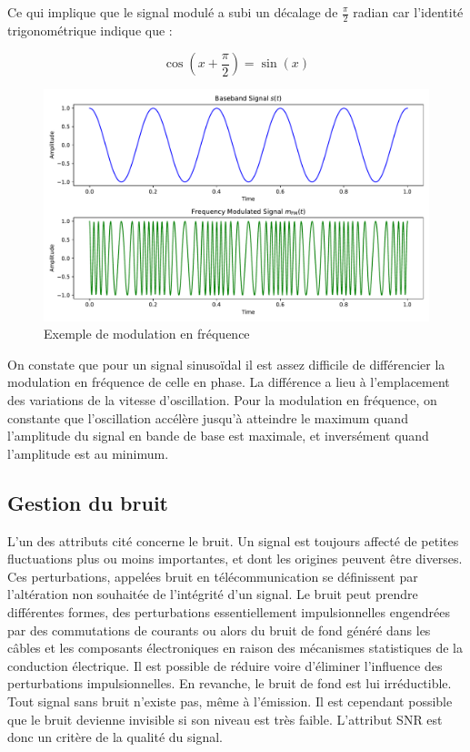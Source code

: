 Ce qui implique que le signal modulé a subi un décalage de $\frac{\pi}{2}$ radian car l'identité trigonométrique indique que :

\begin{equation}\label{eq122}
\cos(x+\frac{\pi}{2}) = \sin(x)
\end{equation}

\begin{figure}[h]
\centering

\includegraphics[scale=0.5]{images/FM_MOD.pdf}
\caption{Exemple de modulation en fréquence}\label{term2}
\end{figure}



On constate que pour un signal sinusoïdal il est assez difficile de différencier la modulation en fréquence de celle en phase. La différence a lieu à l'emplacement des variations de la vitesse d'oscillation. Pour la modulation en fréquence, on constante que l'oscillation accélère jusqu'à atteindre le maximum quand l'amplitude du signal en bande de base est maximale, et inversément quand l'amplitude est au minimum.


\subsection{Gestion du bruit}

L'un des attributs cité concerne le bruit. Un signal est toujours affecté de petites fluctuations plus ou moins importantes, et dont les origines peuvent être diverses. Ces perturbations, appelées bruit en télécommunication se définissent par l'altération non souhaitée de l'intégrité d'un signal. Le bruit peut prendre différentes formes, des perturbations essentiellement impulsionnelles engendrées par des commutations de courants ou alors du bruit de fond généré dans les câbles et les composants électroniques en raison
des mécanismes statistiques de la conduction électrique. Il est possible de réduire voire d'éliminer l'influence des perturbations impulsionnelles. En revanche, le bruit de fond est lui irréductible. Tout signal sans bruit n'existe pas, même à l'émission. Il est cependant possible que le bruit devienne invisible si son niveau est très faible. L'attribut \ac{SNR} est donc un critère de la qualité du signal.


